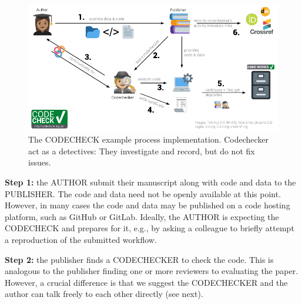 \documentclass[12pt]{article}
\begin{document}
\begin{figure}
  \centering
      \includegraphics[width=\textwidth]{figs/codecheck_overview.pdf}
  \caption{The CODECHECK example process implementation. Codechecker act as a detectives:
  They investigate and record, but do not fix issues.}
  \label{fig:workflow}
\end{figure}

\textbf{Step 1:} the AUTHOR submit their manuscript along with code and data to
the PUBLISHER. The code and data need not be openly available at this point.
However, in many cases the code and data may be published on a code hosting platform,
such as GitHub or GitLab. Ideally, the AUTHOR is expecting the CODECHECK and
prepares for it, e.g., by asking a colleague to briefly attempt a reproduction
of the submitted workflow.

\textbf{Step 2:} the publisher finds a CODECHECKER to check the code. This is
analogous to the publisher finding one or more reviewers to evaluating
the paper. However, a crucial difference is that we suggest the CODECHECKER
and the author can talk freely to each other directly (see next).
\end{document}
